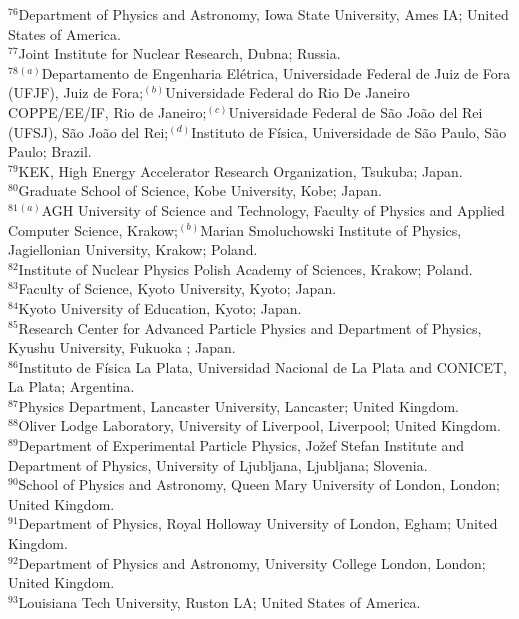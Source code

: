 \begin{flushleft}
$^{76}$Department of Physics and Astronomy, Iowa State University, Ames IA; United States of America.\\
$^{77}$Joint Institute for Nuclear Research, Dubna; Russia.\\
$^{78}$$^{(a)}$Departamento de Engenharia El\'etrica, Universidade Federal de Juiz de Fora (UFJF), Juiz de Fora;$^{(b)}$Universidade Federal do Rio De Janeiro COPPE/EE/IF, Rio de Janeiro;$^{(c)}$Universidade Federal de S\~ao Jo\~ao del Rei (UFSJ), S\~ao Jo\~ao del Rei;$^{(d)}$Instituto de F\'isica, Universidade de S\~ao Paulo, S\~ao Paulo; Brazil.\\
$^{79}$KEK, High Energy Accelerator Research Organization, Tsukuba; Japan.\\
$^{80}$Graduate School of Science, Kobe University, Kobe; Japan.\\
$^{81}$$^{(a)}$AGH University of Science and Technology, Faculty of Physics and Applied Computer Science, Krakow;$^{(b)}$Marian Smoluchowski Institute of Physics, Jagiellonian University, Krakow; Poland.\\
$^{82}$Institute of Nuclear Physics Polish Academy of Sciences, Krakow; Poland.\\
$^{83}$Faculty of Science, Kyoto University, Kyoto; Japan.\\
$^{84}$Kyoto University of Education, Kyoto; Japan.\\
$^{85}$Research Center for Advanced Particle Physics and Department of Physics, Kyushu University, Fukuoka ; Japan.\\
$^{86}$Instituto de F\'{i}sica La Plata, Universidad Nacional de La Plata and CONICET, La Plata; Argentina.\\
$^{87}$Physics Department, Lancaster University, Lancaster; United Kingdom.\\
$^{88}$Oliver Lodge Laboratory, University of Liverpool, Liverpool; United Kingdom.\\
$^{89}$Department of Experimental Particle Physics, Jo\v{z}ef Stefan Institute and Department of Physics, University of Ljubljana, Ljubljana; Slovenia.\\
$^{90}$School of Physics and Astronomy, Queen Mary University of London, London; United Kingdom.\\
$^{91}$Department of Physics, Royal Holloway University of London, Egham; United Kingdom.\\
$^{92}$Department of Physics and Astronomy, University College London, London; United Kingdom.\\
$^{93}$Louisiana Tech University, Ruston LA; United States of America.\\

\end{flushleft}
